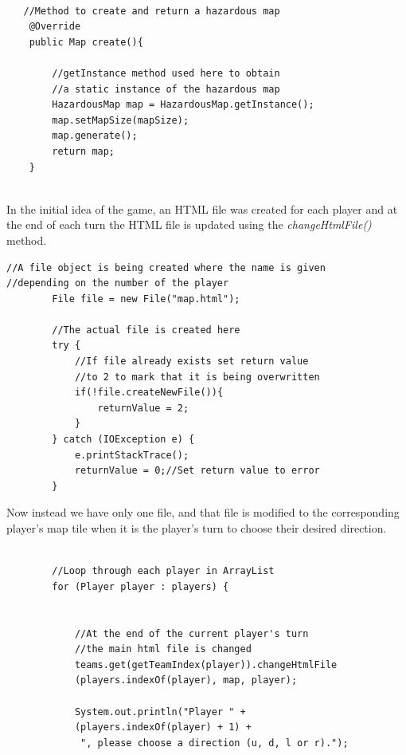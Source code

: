 \documentclass[a4paper,12pt]{extarticle}
\begin{document}
\begin{lstlisting}

   //Method to create and return a hazardous map
    @Override
    public Map create(){

        //getInstance method used here to obtain 
        //a static instance of the hazardous map
        HazardousMap map = HazardousMap.getInstance();
        map.setMapSize(mapSize);
        map.generate();
        return map;
    }


\end{lstlisting}
\vspace{4mm}

\noindent In the initial idea of the game, an HTML file was created for each player and at the end of each turn the HTML file is updated using the \textit{changeHtmlFile()} method.

\begin{lstlisting}
//A file object is being created where the name is given 
//depending on the number of the player
        File file = new File("map.html");

        //The actual file is created here
        try {
            //If file already exists set return value
            //to 2 to mark that it is being overwritten
            if(!file.createNewFile()){
                returnValue = 2;
            }
        } catch (IOException e) {
            e.printStackTrace();
            returnValue = 0;//Set return value to error
        }
\end{lstlisting}
\vspace{4mm}

\noindent Now instead we have only one file, and that file is modified to the corresponding player's map tile when it is the player's turn to choose their desired direction.

\begin{lstlisting}
 
        //Loop through each player in ArrayList
        for (Player player : players) {

            
            //At the end of the current player's turn 
            //the main html file is changed
            teams.get(getTeamIndex(player)).changeHtmlFile
            (players.indexOf(player), map, player);

            System.out.println("Player " + 
            (players.indexOf(player) + 1) +
             ", please choose a direction (u, d, l or r).");
\end{lstlisting}
\end{document}
